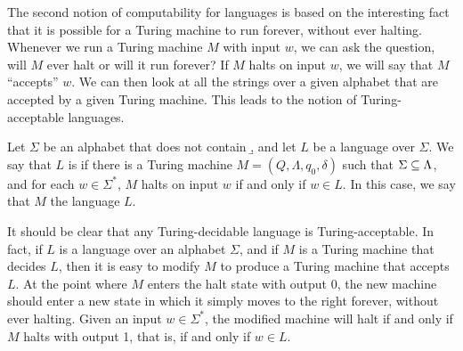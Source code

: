 The second notion of computability for languages is based on the
interesting fact that it is possible for a Turing machine to run
forever, without ever halting.
Whenever we run a Turing machine $M$ with input $w$,
we can ask the question, will $M$ ever halt or will it run forever?  If $M$
halts on input $w$, we will say that $M$ ``accepts'' $w$.  We can then
look at all the strings over a given alphabet that are accepted by
a given Turing machine.  This leads to the notion of Turing-acceptable
languages.
\begin{definition}
Let $\Sigma$ be an alphabet that does not contain \b, and let $L$ be a language over $\Sigma$.
We say that $L$ is  if there is a Turing machine
$M=(Q,\Lambda,q_0,\delta)$ such that $\Sigma\subseteq\Lambda$, and
for each $w\in\Sigma^*$, $M$ halts on input $w$ if and only if $w\in L$.
In this case, we say that $M$  the language $L$.
\end{definition}

It should be clear that any Turing-decidable language is Turing-acceptable.
In fact, if $L$ is a language over an alphabet $\Sigma$,
and if $M$ is a Turing machine that
decides $L$, then it is easy to modify $M$ to produce a Turing machine
that accepts $L$.  At the point where $M$ enters the halt state with
output 0, the new machine should enter a new state in which it simply
moves to the right forever, without ever halting.  Given an input
$w\in\Sigma^*$, the modified machine will halt if and only if $M$
halts with output 1, that is, if and only if $w\in L$.

